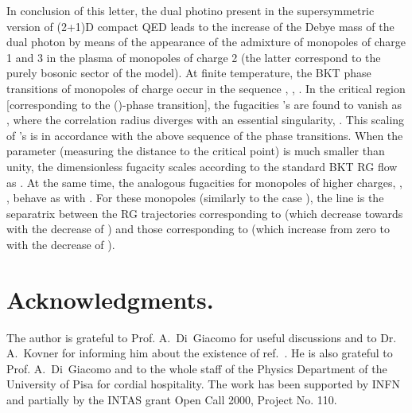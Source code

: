 \documentclass[a4paper,12pt]{article}
\begin{document}
In conclusion of this letter, the dual photino present in the supersymmetric version of (2+1)D compact QED
leads to the increase of the Debye mass of the dual photon by means of the appearance of
the admixture of monopoles of charge 1 and 3 in the plasma of monopoles of charge 2 (the latter correspond
to the purely bosonic sector of the model). At finite temperature, the BKT phase transitions
of monopoles of charge \coordHE{} occur in the sequence \coordHE{}, \coordHE{}, \coordHE{}. In the critical region [corresponding
to the (\coordHE{})-phase transition], the fugacities \coordHE{}'s are found to vanish as
\coordHE{}, where the correlation radius \coordHE{} diverges with an essential singularity,
\coordHE{}. This scaling of \coordHE{}'s is in accordance with
the above sequence of the phase transitions.
When the parameter \coordHE{} (measuring the distance to the
critical point) is much smaller than unity, the dimensionless fugacity \coordHE{} scales according to the standard BKT RG flow
as \coordHE{}. At the same time, the analogous fugacities for monopoles of higher charges, \coordHE{}, \coordHE{},
behave as \coordHE{} with \coordHE{}. For these monopoles (similarly to the case \coordHE{}),
the line \coordHE{} is the separatrix
between the RG trajectories corresponding to \coordHE{} (which decrease towards \coordHE{} with the
decrease of \coordHE{}) and those corresponding to \coordHE{} (which increase from zero to
\coordHE{} with the decrease of \coordHE{}).



\section{Acknowledgments.}
The author is grateful
to Prof. A.~Di~Giacomo for useful discussions and to Dr. A.~Kovner for informing him about the existence of
ref.~\cite{ahw}.
He is also grateful to
Prof. A.~Di~Giacomo and to the whole staff of the Physics Department of the
University of Pisa for cordial hospitality.
The work has been supported by INFN and partially by
the INTAS grant Open Call 2000, Project No. 110.
\end{document}
